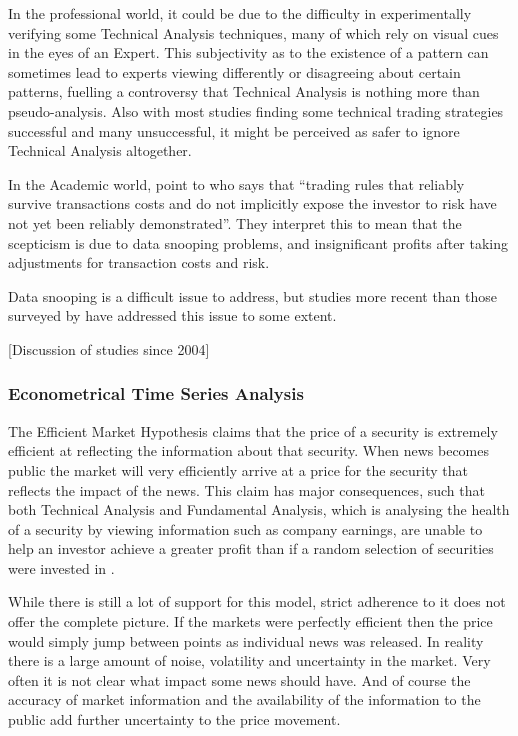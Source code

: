 \documentclass{article}
\theoremstyle{definition}
\begin{document}
In the professional world, it could be due to the difficulty in experimentally verifying some Technical Analysis techniques, many of which rely on visual cues in the eyes of an Expert. This subjectivity as to the existence of a pattern can sometimes lead to experts viewing differently or disagreeing about certain patterns, fuelling a controversy that Technical Analysis is nothing more than pseudo-analysis. Also with most studies finding some technical trading strategies successful and many unsuccessful, it might be perceived as safer to ignore Technical Analysis altogether.

In the Academic world, \cite{taprofitability} point to \cite{assetpricing} who says that ``trading rules that reliably survive transactions costs and do not implicitly expose the investor to risk have not yet been reliably demonstrated''. They interpret this to mean that the scepticism is due to data snooping problems, and insignificant profits after taking adjustments for transaction costs and risk.

Data snooping is a difficult issue to address, but studies more recent than those surveyed by \cite{taprofitability} have addressed this issue to some extent.

[Discussion of studies since 2004]

\subsubsection{Econometrical Time Series Analysis}

The Efficient Market Hypothesis claims that the price of a security is extremely efficient at reflecting the information about that security. When news becomes public the market will very efficiently arrive at a price for the security that reflects the impact of the news. This claim has major consequences, such that both Technical Analysis and Fundamental Analysis, which is analysing the health of a security by viewing information such as company earnings, are unable to help an investor achieve a greater profit than if a random selection of securities were invested in \citep{emhAndCritics}. 

While there is still a lot of support for this model, strict adherence to it does not offer the complete picture. If the markets were perfectly efficient then the price would simply jump between points as individual news was released. In reality there is a large amount of noise, volatility and uncertainty in the market. Very often it is not clear what impact some news should have. And of course the accuracy of market information and the availability of the information to the public add further uncertainty to the price movement.
\end{document}
